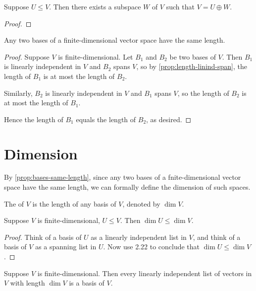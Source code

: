 \begin{proposition}
Suppose $U\le V$. Then there exists a subspace $W$ of $V$ such that $V=U\oplus W$.
\end{proposition}

\begin{proof}

\end{proof}

\begin{proposition}\label{prop:bases-same-length}
Any two bases of a finite-dimensional vector space have the same length.
\end{proposition}

\begin{proof}
Suppose $V$ is finite-dimensional. Let $B_1$ and $B_2$ be two bases of $V$. Then $B_1$ is linearly independent in $V$ and $B_2$ spans $V$, so by \cref{prop:length-linind-span}, the length of $B_1$ is at most the length of $B_2$.

Similarly, $B_2$ is linearly independent in $V$ and $B_1$ spans $V$, so the length of $B_2$ is at most the length of $B_1$.

Hence the length of $B_1$ equals the length of $B_2$, as desired.
\end{proof}

\section{Dimension}
By \cref{prop:bases-same-length}, since any two bases of a fnite-dimensional vector space have the same length, we can formally define the dimension of such spaces.

\begin{definition}[Dimension]
The  of $V$ is the length of any basis of $V$, denoted by $\dim V$.
\end{definition}

\begin{proposition}
Suppose $V$ is finite-dimensional, $U\le V$. Then $\dim U\le\dim V$.
\end{proposition}

\begin{proof}
Think of a basis of $U$ as a linearly independent list in $V$, and think of a basis of $V$ as a spanning list in $U$. Now use 2.22 to conclude that $\dim U\le\dim V$.
\end{proof}

\begin{proposition}
Suppose $V$ is finite-dimensional. Then every linearly independent list of vectors in $V$ with length $\dim V$ is a basis of $V$.
\end{proposition}

